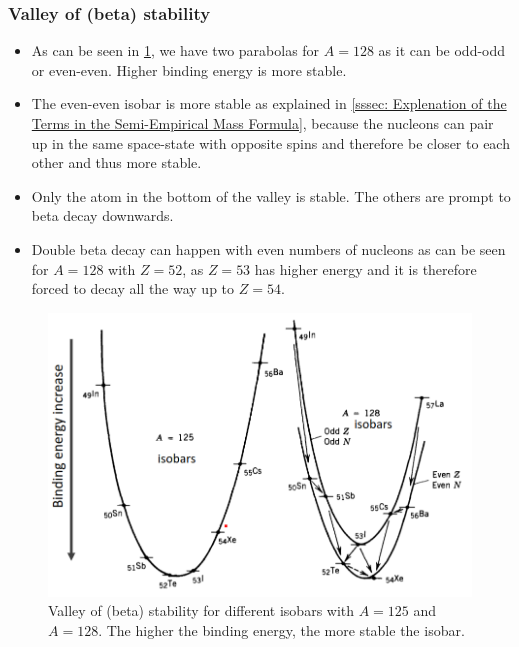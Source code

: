 \subsubsection{Valley of (beta) stability}
\begin{itemize}
    \item As can be seen in \cref{fig: valley_beta_stability}, we have two parabolas for $A = 128$ as it can be odd-odd or even-even. Higher binding energy is more stable.
    \item The even-even isobar is more stable as explained in \cref{sssec: Explenation of the Terms in the Semi-Empirical Mass Formula}, because the nucleons can pair up in the same space-state with opposite spins and therefore be closer to each other and thus more stable.
    \item Only the atom in the bottom of the valley is stable. The others are prompt to beta decay downwards. 
    \item Double beta decay can happen with even numbers of nucleons as can be seen for $A = 128$ with $Z = 52$, as $Z = 53$ has higher energy and it is therefore forced to decay all the way up to $Z = 54$. 
\end{itemize}
\begin{figure}[h!]
\centering
\includegraphics[width = .6\textwidth]{valley_beta_stability.png}
\caption{Valley of (beta) stability for different isobars with $A = 125$ and $A = 128$. The higher the binding energy, the more stable the isobar.}
\label{fig: valley_beta_stability}
\end{figure}

